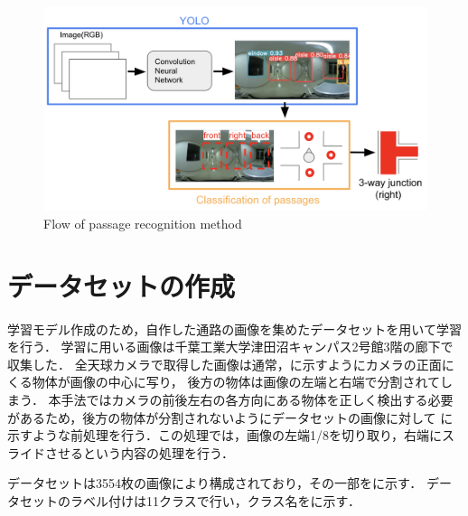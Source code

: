 \documentclass[../main]{subfiles}
\begin{document}
        \begin{figure}[H]
            \centering
            \includegraphics[width=15cm]{../images/proposed_method.png}
            \caption{Flow of passage recognition method}
            \label{figure::proposed_method}
        \end{figure}

        \newpage

        \section{データセットの作成}
        学習モデル作成のため，自作した通路の画像を集めたデータセットを用いて学習を行う．
        学習に用いる画像は千葉工業大学津田沼キャンパス2号館3階の廊下で収集した．
        全天球カメラで取得した画像は通常，に示すようにカメラの正面にくる物体が画像の中心に写り，
        後方の物体は画像の左端と右端で分割されてしまう．
        本手法ではカメラの前後左右の各方向にある物体を正しく検出する必要があるため，後方の物体が分割されないようにデータセットの画像に対して
        に示すような前処理を行う．この処理では，画像の左端1/8を切り取り，右端にスライドさせるという内容の処理を行う．


        データセットは3554枚の画像により構成されており，その一部をに示す．
        データセットのラベル付けは11クラスで行い，クラス名をに示す．
    
\end{document}
